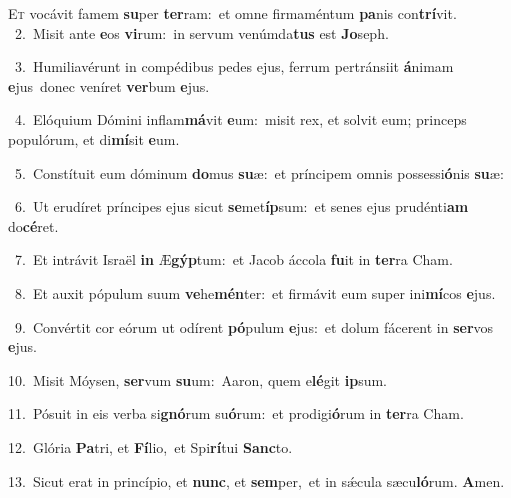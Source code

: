 \lettrine{\initial\textcolor{\initialcolor}{E}}{t} vocávit famem \textbf{su}\-per \textbf{ter}\-ram:~\star et omne firmaméntum \textbf{pa}\-nis con\-\textbf{trí}\-vit.\\
{\numbfont\textcolor{\numbcolor}{~2.}}~Misit ante \textbf{e}\-os \textbf{vi}\-rum:~\star in servum venúmda\textbf{tus} est \textbf{Jo}\-seph.\par
{\numbfont\textcolor{\numbcolor}{~3.}}~Humiliavérunt in compédibus pedes ejus, ferrum pertránsiit \textbf{á}\-nimam \textbf{e}\-jus~\star donec veníret \textbf{ver}\-bum \textbf{e}\-jus.\par
{\numbfont\textcolor{\numbcolor}{~4.}}~Elóquium Dómini inflam\-\textbf{má}\-vit \textbf{e}\-um:~\star misit rex, et solvit eum; princeps populórum, et di\-\textbf{mí}\-sit \textbf{e}\-um.\par
{\numbfont\textcolor{\numbcolor}{~5.}}~Constítuit eum dóminum \textbf{do}\-mus \textbf{su}\-æ:~\star et príncipem omnis possessi\-\textbf{ó}\-nis \textbf{su}\-æ:\par
{\numbfont\textcolor{\numbcolor}{~6.}}~Ut erudíret príncipes ejus sicut \textbf{se}\-met\-\textbf{íp}\-sum:~\star et senes ejus prudénti\textbf{am} do\-\textbf{cé}\-ret.\par
{\numbfont\textcolor{\numbcolor}{~7.}}~Et intrávit Israël \textbf{in} Æ\-\textbf{gýp}\-tum:~\star et Jacob áccola \textbf{fu}\-it in \textbf{ter}\-ra Cham.\par
{\numbfont\textcolor{\numbcolor}{~8.}}~Et auxit pópulum suum \textbf{ve}\-he\-\textbf{mén}\-ter:~\star et firmávit eum super ini\-\textbf{mí}\-cos \textbf{e}\-jus.\par
{\numbfont\textcolor{\numbcolor}{~9.}}~Convértit cor eórum ut odírent \textbf{pó}\-pulum \textbf{e}\-jus:~\star et dolum fácerent in \textbf{ser}\-vos \textbf{e}\-jus.\par
{\numbfont\textcolor{\numbcolor}{10.}}~Misit Móysen, \textbf{ser}\-vum \textbf{su}\-um:~\star Aaron, quem e\-\textbf{lé}\-git \textbf{ip}\-sum.\par
{\numbfont\textcolor{\numbcolor}{11.}}~Pósuit in eis verba si\-\textbf{gnó}\-rum su\-\textbf{ó}\-rum:~\star et prodigi\-\textbf{ó}\-rum in \textbf{ter}\-ra Cham.\par
{\numbfont\textcolor{\numbcolor}{12.}}~Glória \textbf{Pa}\-tri, et \textbf{Fí}\-lio,~\star et Spi\-\textbf{rí}\-tui \textbf{Sanc}\-to.\par
{\numbfont\textcolor{\numbcolor}{13.}}~Sicut erat in princípio, et \textbf{nunc}\-, et \textbf{sem}\-per,~\star et in sǽcula sæcu\-\textbf{ló}\-rum. \textbf{A}\-men.\par
